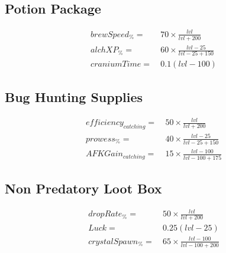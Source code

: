     \subsection{Potion Package}
        \begin{align*}
            brewSpeed_\% = &\   70 \times \frac{{lvl}}{{lvl}+200}
            \\
            alchXP_\% = &\  60 \times \frac{{lvl}-25}{{lvl}-25+150}
            \\
            craniumTime = &\  0.1(lvl-100)
        \end{align*}

    \subsection{Bug Hunting Supplies}
        \begin{align*}
            efficiency_{catching}= &\   50 \times \frac{{lvl}}{{lvl}+200} 
            \\
            prowess_\% = &\  40 \times \frac{{lvl}-25}{{lvl}-25+150}
            \\
            AFKGain_{catching} = &\ 15 \times \frac{{lvl}-100}{{lvl}-100+175}
        \end{align*}

    \subsection{Non Predatory Loot Box}
        \begin{align*}
            dropRate_\% = &\  50 \times \frac{{lvl}}{{lvl}+200} 
            \\
            Luck = &\  0.25(lvl-25)
            \\
            crystalSpawn_\% = &\  65 \times \frac{{lvl}-100}{{lvl}-100+200}
        \end{align*}
